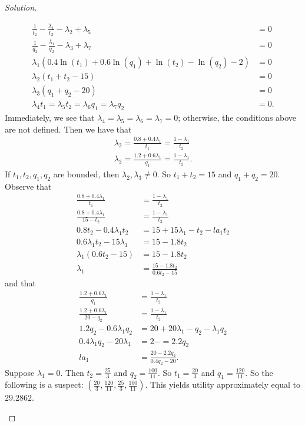\documentclass[12pt]{article}
\theoremstyle{definition}
\theoremstyle{remark}
\def\la{\lambda}
\begin{document}
\begin{proof}[Solution]
\begin{enumerate}
\begin{align*}
      \frac{1}{t_2} - \frac{\la_1}{t_2} - \la_2 + \la_5 &= 0 \\
      \frac{1}{q_2} - \frac{\la_1}{q_2} -\la_3 + \la_7 &= 0 \\
      \la_1(0.4\ln(t_1) + 0.6\ln(q_1) + \ln(t_2) - \ln(q_2) - 2) &= 0 \\
      \la_2(t_1 + t_2 - 15) &= 0 \\
      \la_3(q_1 + q_2 - 20) &= 0 \\
      \la_4t_1 = \la_5t_2 = \la_6q_1 = \la_7q_2 &= 0.
    \end{align*}
    Immediately, we see that $\la_4 = \la_5 = \la_6 = \la_7 = 0$; otherwise, the conditions above are not defined. Then we have that
    \begin{align*}
      \la_2 = \frac{0.8 + 0.4\la_1}{t_1} = \frac{1 - \la_1}{t_2} \\
      \la_3 = \frac{1.2 + 0.6\la_1}{q_1} = \frac{1 - \la_1}{t_2}.
    \end{align*}
    If $t_1, t_2, q_1, q_2$ are bounded, then $\la_2, \la_3 \neq 0$. So $t_1 + t_2 = 15$ and $q_1 + q_2 = 20$.
    Observe that
    \begin{align*}
      \frac{0.8 + 0.4\la_1}{t_1} &= \frac{1 - \la_1}{t_2} \\
      \frac{0.8 + 0.4\la_1}{15 - t_2} &= \frac{1 - \la_1}{t_2} \\
      0.8t_2 - 0.4\la_1t_2 &= 15 + 15\la_1 - t_2 - la_1t_2 \\
      0.6\la_1t_2 - 15\la_1 &= 15 - 1.8t_2 \\
      \la_1(0.6t_2 - 15) &= 15 - 1.8t_2 \\
      \la_1 &= \frac{15 - 1.8t_2}{0.6t_2 - 15}
    \end{align*}
    and that
    \begin{align*}
      \frac{1.2 + 0.6\la_1}{q_1} &= \frac{1 - \la_1}{t_2} \\
      \frac{1.2 + 0.6\la_1}{20 - q_2} &= \frac{1 - \la_1}{t_2} \\
      1.2q_2 - 0.6\la_1q_2 &= 20 + 20\la_1 - q_2 - \la_1q_2 \\
      0.4\la_1q_2 - 20\la_1 &= 2- = 2.2q_2 \\
      la_1 &= \frac{20 - 2.2q_2}{0.4q_2 - 20}.
    \end{align*}
    Suppose $\la_1 = 0$. Then $t_2 = \frac{25}{3}$ and $q_2 = \frac{100}{11}$. So $t_1 = \frac{20}{3}$ and $q_1 = \frac{120}{11}$. So the following is a suspect: $(\frac{20}{3}, \frac{120}{11}, \frac{25}{3}, \frac{100}{11})$. This yields utility approximately equal to $29.2862$.

\end{enumerate}
\end{proof}
\end{document}
